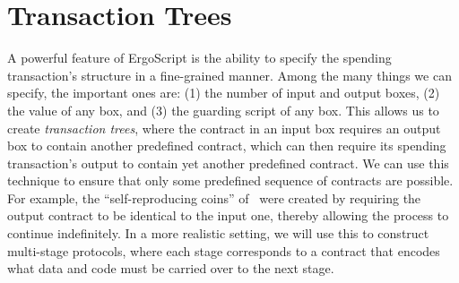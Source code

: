 \documentclass[runningheads]{llncs}
\newcommand{\langname}{ErgoScript\xspace}
\begin{document}
\section{Transaction Trees}
A powerful feature of \langname is the ability to specify the spending transaction's structure in a fine-grained manner. 
Among the many things we can specify, the important ones are: (1) the number of input and output boxes, (2) the value of any box, and (3) the guarding script of any box. This allows us to create {\em transaction trees}, where the contract in an input box requires an output box to contain another predefined contract, which can then require its spending transaction's output to contain yet another predefined contract. We can use this technique to ensure that only some predefined sequence of contracts are possible. For example, the ``self-reproducing coins'' of~\cite{CKM18a} were created by requiring the output contract to be identical to the input one, thereby allowing the process to continue indefinitely. In a more realistic setting, we will use this to construct multi-stage protocols, where each stage corresponds to a contract that encodes what data and code must be carried over to the next stage. 
\end{document}
